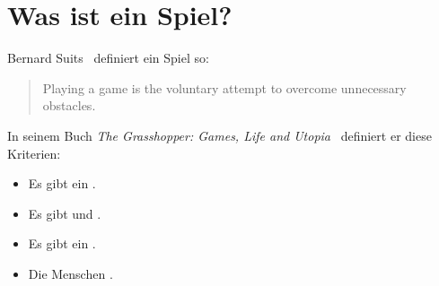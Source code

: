 \section{Was ist ein Spiel?}
\label{spiel-definition}

Bernard Suits~\cite{game-suits} definiert ein Spiel so:

\begin{quote}
  Playing a game is the voluntary attempt to overcome unnecessary obstacles.
\end{quote}

In seinem Buch \emph{The Grasshopper: Games, Life and Utopia}~\cite{suits-grashopper} definiert er diese Kriterien:

\begin{itemize}
  \item Es gibt ein .
  \item Es gibt  und .
  \item Es gibt ein .
  \item Die Menschen .
\end{itemize}
